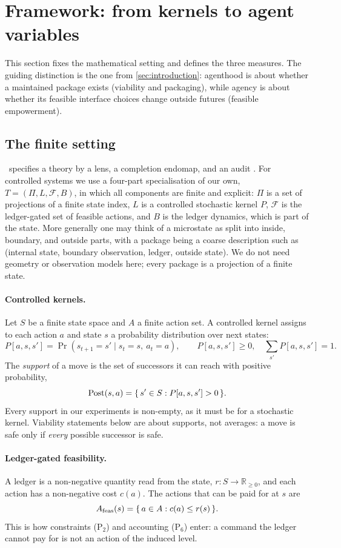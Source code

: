\section{Framework: from kernels to agent variables}
\label{sec:engine}

This section fixes the mathematical setting and defines the three measures. The guiding distinction is the one from \cref{sec:introduction}: agenthood is about whether a maintained package exists (viability and packaging), while agency is about whether its feasible interface choices change outside futures (feasible empowerment).

\subsection{The finite setting}
\SBT\ specifies a theory by a lens, a completion endomap, and an audit \citep{six_birds_theory}. For controlled systems we use a four-part specialisation of our own, $T=(\Pi,L,\mathcal{F},B)$, in which all components are finite and explicit: $\Pi$ is a set of projections of a finite state index, $L$ is a controlled stochastic kernel $P$, $\mathcal{F}$ is the ledger-gated set of feasible actions, and $B$ is the ledger dynamics, which is part of the state. More generally one may think of a microstate as split into inside, boundary, and outside parts, with a package being a coarse description such as (internal state, boundary observation, ledger, outside state). We do not need geometry or observation models here; every package is a projection of a finite state.

\paragraph{Controlled kernels.}
Let $S$ be a finite state space and $A$ a finite action set. A controlled kernel assigns to each action $a$ and state $s$ a probability distribution over next states:
\[
P[a,s,s'] = \Pr(s_{t+1}=s' \mid s_t=s,\ a_t=a), \qquad P[a,s,s']\ge 0,\quad \textstyle\sum_{s'}P[a,s,s']=1.
\]
The \emph{support} of a move is the set of successors it can reach with positive probability,
\[
\mathrm{Post}(s,a) = \{\, s' \in S : P[a,s,s']>0 \,\}.
\]
Every support in our experiments is non-empty, as it must be for a stochastic kernel. Viability statements below are about supports, not averages: a move is safe only if \emph{every} possible successor is safe.

\paragraph{Ledger-gated feasibility.}
A ledger is a non-negative quantity read from the state, $r:S\to\mathbb{R}_{\ge 0}$, and each action has a non-negative cost $c(a)$. The actions that can be paid for at $s$ are
\[
A_{\mathrm{feas}}(s) = \{\, a\in A : c(a)\le r(s) \,\}.
\]
This is how constraints (P$_2$) and accounting (P$_6$) enter: a command the ledger cannot pay for is not an action of the induced level.

